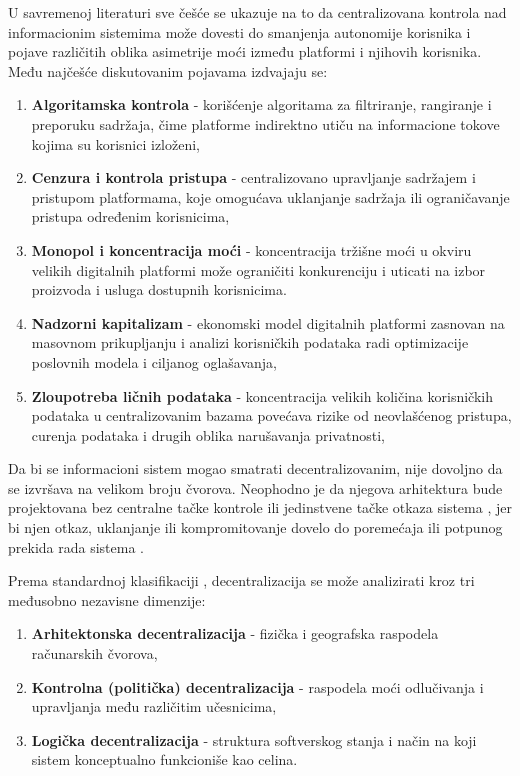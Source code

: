 U savremenoj literaturi sve češće se ukazuje na to da centralizovana kontrola nad informacionim sistemima može dovesti do smanjenja autonomije korisnika i pojave različitih oblika asimetrije moći između platformi i njihovih korisnika. Među najčešće diskutovanim pojavama izdvajaju se:
\begin{enumerate}
\item \textbf{Algoritamska kontrola} \cite{bakshy2015exposure} - korišćenje algoritama za filtriranje, rangiranje i preporuku sadržaja, čime platforme indirektno utiču na informacione tokove kojima su korisnici izloženi,
\item \textbf{Cenzura i kontrola pristupa} \cite{roberts2019behind} - centralizovano upravljanje sadržajem i pristupom platformama, koje omogućava uklanjanje sadržaja ili ograničavanje pristupa određenim korisnicima,
\item \textbf{Monopol i koncentracija moći} \cite{khan2016amazon} - koncentracija tržišne moći u okviru velikih digitalnih platformi može ograničiti konkurenciju i uticati na izbor proizvoda i usluga dostupnih korisnicima.
\item \textbf{Nadzorni kapitalizam} \cite{zuboff2023age} - ekonomski model digitalnih platformi zasnovan na masovnom prikupljanju i analizi korisničkih podataka radi optimizacije poslovnih modela i ciljanog oglašavanja,
\item \textbf{Zloupotreba ličnih podataka} \cite{acquisti2016economics} - koncentracija velikih količina korisničkih podataka u centralizovanim bazama povećava rizike od neovlašćenog pristupa, curenja podataka i drugih oblika narušavanja privatnosti,
\end{enumerate}

Da bi se informacioni sistem mogao smatrati decentralizovanim, nije dovoljno da se izvršava na velikom broju čvorova. Neophodno je da njegova arhitektura bude projektovana bez centralne tačke kontrole ili jedinstvene tačke otkaza sistema , jer bi njen otkaz, uklanjanje ili kompromitovanje dovelo do poremećaja ili potpunog prekida rada sistema \cite{baran1964distributed}.

Prema standardnoj klasifikaciji \cite{buterin2017meaning}, decentralizacija se može analizirati kroz tri međusobno nezavisne dimenzije:
\begin{enumerate}
\item \textbf{Arhitektonska decentralizacija} - fizička i geografska raspodela računarskih čvorova,
\item \textbf{Kontrolna (politička) decentralizacija} - raspodela moći odlučivanja i upravljanja među različitim učesnicima,
\item \textbf{Logička decentralizacija} - struktura softverskog stanja i način na koji sistem konceptualno funkcioniše kao celina.
\end{enumerate}

